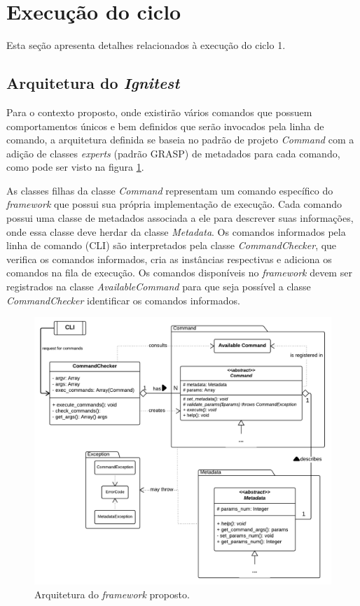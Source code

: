   \section{Execução do ciclo}
  
      Esta seção apresenta detalhes relacionados à execução do ciclo 1.
      
      \subsection{Arquitetura do \textit{Ignitest}}
      
	  Para o contexto proposto, onde existirão vários comandos que possuem comportamentos únicos e bem definidos que serão
	  invocados pela linha de comando, a arquitetura definida se baseia no padrão de projeto \textit{Command} \cite{gamma}
	  com a adição de classes \textit{experts} (padrão GRASP) de metadados para cada comando, como pode ser visto na
	  figura \ref{ignitest-architecture}.
	   
	  As classes filhas da classe \textit{Command} representam um comando específico do \textit{framework} que possui sua 
	  própria implementação de execução. Cada comando possui uma classe de metadados associada a ele para descrever suas
	  informações, onde essa classe deve herdar da classe \textit{Metadata}. Os comandos informados pela linha de comando (CLI)
	  são interpretados pela classe \textit{CommandChecker}, que verifica os comandos informados, cria as instâncias respectivas
	  e adiciona os comandos na fila de execução. Os comandos disponíveis no \textit{framework} devem ser registrados na classe
	  \textit{AvailableCommand} para que seja possível a classe \textit{CommandChecker} identificar os comandos informados.
	  
	  \vfill
	  \pagebreak
	  \begin{figure}[!htb]
	    \centering
	    \includegraphics[scale=0.35]{figuras/ignitest-architecture.png}
	    \caption{Arquitetura do \textit{framework} proposto.}
	    \label{ignitest-architecture}
	  \end{figure}
      
